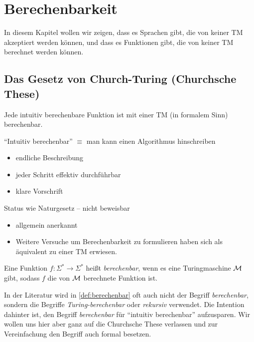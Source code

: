 \section[Berechenbarkeit]{Berechenbarkeit}



In diesem Kapitel wollen wir zeigen, 
dass es Sprachen gibt, die von keiner \ac{TM} akzeptiert werden können, und
dass es Funktionen gibt, die von keiner \ac{TM} berechnet werden können.


\subsection{Das Gesetz von Church-Turing (Churchsche These)} %
\begin{These*}[name={[Intuitiv berechenbare Funktionen sind mit \acs*{TM} berechenbar]}]
	Jede intuitiv berechenbare Funktion ist mit einer \ac{TM} (in formalem Sinn) berechenbar.
	
	{\color{red}
	"`Intuitiv berechenbar"' $\equiv$ man kann einen Algorithmus hinschreiben
	\begin{itemize}
		\item endliche Beschreibung
		\item jeder Schritt effektiv durchführbar
		\item klare Vorschrift
	\end{itemize}
	Status wie Naturgesetz -- nicht beweisbar
	\begin{itemize}[label=\->]
		\item allgemein anerkannt
		\item Weitere Versuche um Berechenbarkeit zu formulieren haben sich als äquivalent zu einer \ac{TM} erwiesen.
	\qedhere
	\end{itemize}
	}
\end{These*}

\begin{Def}\label{def:berechenbar}
 Eine Funktion $f:\Sigma^*\rightarrow\Sigma^*$ heißt \emph{berechenbar}, wenn es eine Turingmaschine $\mathcal{M}$ gibt,
 sodass $f$ die von $\mathcal{M}$ berechnete Funktion ist.
\end{Def}
\begin{Bemerkung}
 In der Literatur wird in \autoref{def:berechenbar} oft auch nicht der Begriff \emph{berechenbar}, sondern die Begriffe \emph{Turing-berechenbar} oder \emph{rekursiv} verwendet.
 Die Intention dahinter ist, den Begriff \emph{berechenbar} für "`intuitiv berechenbar"' aufzusparen.
 Wir wollen uns hier aber ganz auf die Churchsche These verlassen und zur Vereinfachung den Begriff auch formal besetzen.
\end{Bemerkung}




